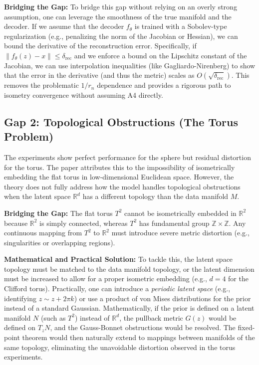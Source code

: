 \documentclass{article}
\begin{document}
\textbf{Bridging the Gap:} To bridge this gap without relying on an overly strong assumption, one can leverage the smoothness of the true manifold and the decoder. If we assume that the decoder $f_\theta$ is trained with a Sobolev-type regularization (e.g., penalizing the norm of the Jacobian or Hessian), we can bound the derivative of the reconstruction error. Specifically, if $\|f_\theta(z) - x\| \leq \delta_{\mathrm{rec}}$ and we enforce a bound on the Lipschitz constant of the Jacobian, we can use interpolation inequalities (like Gagliardo-Nirenberg) to show that the error in the derivative (and thus the metric) scales as $O(\sqrt{\delta_{\mathrm{rec}}})$. This removes the problematic $1/r_n$ dependence and provides a rigorous path to isometry convergence without assuming A4 directly.

\subsection{Gap 2: Topological Obstructions (The Torus Problem)}
The experiments show perfect performance for the sphere but residual distortion for the torus. The paper attributes this to the impossibility of isometrically embedding the flat torus in low-dimensional Euclidean space. However, the theory does not fully address how the model handles topological obstructions when the latent space $\mathbb{R}^d$ has a different topology than the data manifold $M$.

\textbf{Bridging the Gap:} The flat torus $T^2$ cannot be isometrically embedded in $\mathbb{R}^2$ because $\mathbb{R}^2$ is simply connected, whereas $T^2$ has fundamental group $\mathbb{Z} \times \mathbb{Z}$. Any continuous mapping from $T^2$ to $\mathbb{R}^2$ must introduce severe metric distortion (e.g., singularities or overlapping regions). 

\textbf{Mathematical and Practical Solution:} 
To tackle this, the latent space topology must be matched to the data manifold topology, or the latent dimension must be increased to allow for a proper isometric embedding (e.g., $d=4$ for the Clifford torus). 
Practically, one can introduce a \emph{periodic latent space} (e.g., identifying $z \sim z + 2\pi k$) or use a product of von Mises distributions for the prior instead of a standard Gaussian. Mathematically, if the prior is defined on a latent manifold $N$ (such as $T^2$) instead of $\mathbb{R}^d$, the pullback metric $G(z)$ would be defined on $T_z N$, and the Gauss-Bonnet obstructions would be resolved. The fixed-point theorem would then naturally extend to mappings between manifolds of the same topology, eliminating the unavoidable distortion observed in the torus experiments.
\end{document}
